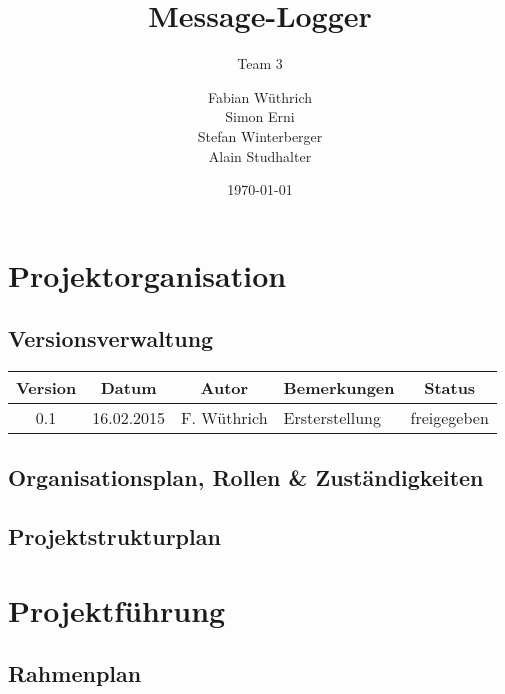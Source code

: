\documentclass[11pt,a4paper]{scrreprt}
\begin{document}
\titlehead{Hochschule Luzern \\ 
	Technik \& Architektur}
\subject{Projektmanagementplan}
\title{Message-Logger}
\subtitle{Team 3}
\author{Fabian Wüthrich \\ 
	Simon Erni \\ 
	Stefan Winterberger \\ 
	Alain Studhalter}
\date{\today}
\publishers{Verteilte Systeme \& Komponenten}

\maketitle

\tableofcontents

\chapter{Projektorganisation}

\section{Versionsverwaltung}

\begin{table}[h!]
	\renewcommand{\arraystretch}{1.5}
	\begin{tabular}{|c|c|c|p{7cm}|c|}
		\hline
		Version & Datum & Autor & Bemerkungen & Status \\ \hline
		0.1 & 16.02.2015 & F. Wüthrich & Ersterstellung & freigegeben \\ \hline
	\end{tabular}
\end{table}

\section{Organisationsplan, Rollen \& Zuständigkeiten}

\section{Projektstrukturplan}

\chapter{Projektführung}

\section{Rahmenplan}
\end{document}

